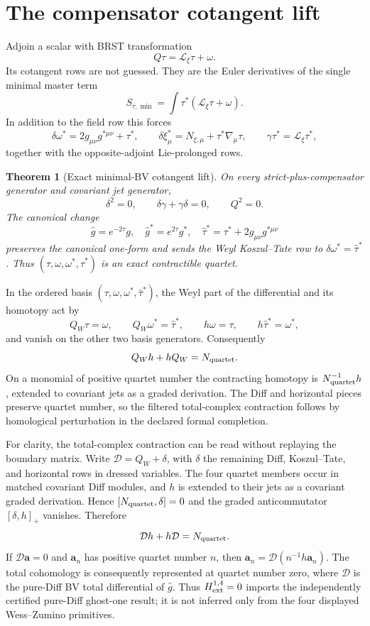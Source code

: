 \documentclass[11pt]{article}
\newtheorem{theorem}{Theorem}[section]
\theoremstyle{definition}
\theoremstyle{remark}
\newcommand{\ghat}{\widehat g}
\begin{document}
\section{The compensator cotangent lift}

Adjoin a scalar with BRST transformation
\[
 Q\tau=\mathcal L_\xi\tau+\omega.
\]
Its cotangent rows are not guessed.  They are the Euler derivatives of the
single minimal master term
\[
 S_{\tau,\min}=\int\tau^*(\mathcal L_\xi\tau+\omega).
\]
In addition to the field row this forces
\[
 \delta\omega^*=2g_{\mu\nu}g^{*\mu\nu}+\tau^*,
 \qquad
 \delta\xi^*_{\mu}=N_{\xi,\mu}+\tau^*\nabla_\mu\tau,
 \qquad
 \gamma\tau^*=\mathcal L_\xi\tau^*,
\]
together with the opposite-adjoint Lie-prolonged rows.

\begin{theorem}[Exact minimal-BV cotangent lift]
On every strict-plus-compensator generator and covariant jet generator,
\[
 \delta^2=0,
 \qquad \delta\gamma+\gamma\delta=0,
 \qquad Q^2=0.
\]
The canonical change
\[
 \ghat=e^{-2\tau}g,
 \quad \widehat g^*=e^{2\tau}g^*,
 \quad \widehat\tau^*=\tau^*+2g_{\mu\nu}g^{*\mu\nu}
\]
preserves the canonical one-form and sends the Weyl Koszul--Tate row to
$\delta\omega^*=\widehat\tau^*$.  Thus
$(\tau,\omega,\omega^*,\widehat\tau^*)$ is an exact contractible quartet.
\end{theorem}

In the ordered basis $(\tau,\omega,\omega^*,\widehat\tau^*)$, the Weyl part
of the differential and its homotopy act by
\[
 Q_W\tau=\omega,\qquad Q_W\omega^*=\widehat\tau^*,
 \qquad h\omega=\tau,\qquad h\widehat\tau^*=\omega^*,
\]
and vanish on the other two basis generators.  Consequently
\[
 Q_Wh+hQ_W=N_{\rm quartet}.
\]
On a monomial of positive quartet number the contracting homotopy is
$N_{\rm quartet}^{-1}h$, extended to covariant jets as a graded derivation.
The Diff and horizontal pieces preserve quartet number, so the filtered
total-complex contraction follows by homological perturbation in the declared
formal completion.

For clarity, the total-complex contraction can be read without replaying the
boundary matrix.  Write $\mathcal D=Q_W+\delta$, with $\delta$ the remaining
Diff, Koszul--Tate, and horizontal rows in dressed variables.  The four
quartet members occur in matched covariant Diff modules, and $h$ is extended
to their jets as a covariant graded derivation.  Hence
\(
 [N_{\rm quartet},\delta]=0
\)
and the graded anticommutator $[\delta,h]_+$ vanishes.  Therefore
\[
 \mathcal D h+h\mathcal D=N_{\rm quartet}.
\]
If $\mathcal D\mathbf a=0$ and $\mathbf a_n$ has positive quartet number
$n$, then
\(
 \mathbf a_n=\mathcal D(n^{-1}h\mathbf a_n)
\).
The total cohomology is consequently represented at quartet number zero,
where $\mathcal D$ is the pure-Diff BV total differential of $\widehat g$.
Thus $H^{1,4}_{\rm ext}=0$ imports the independently certified pure-Diff
ghost-one result; it is not inferred only from the four displayed
Wess--Zumino primitives.
\end{document}
